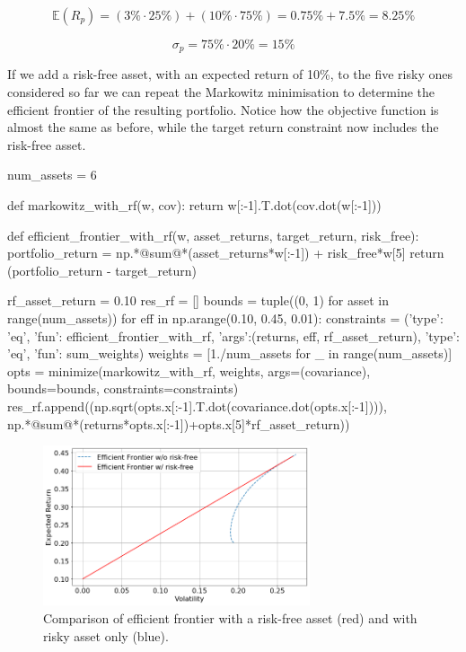 \[ \mathbb{E}(R_p) = (3\% \cdot 25\%) + (10\% \cdot 75\%) = 0.75\% + 7.5\% = 8.25\% \]

\[ \sigma_p = 75\% \cdot 20\% = 15\% \]

If we add a risk-free asset, with an expected return of 10\%, to the five risky ones considered so far we can repeat the Markowitz minimisation to determine the efficient frontier of the resulting portfolio. Notice how the objective function is almost the same as before, while the target return constraint now includes the risk-free asset.

\begin{ipython}
num_assets = 6

def markowitz_with_rf(w, cov):
    return w[:-1].T.dot(cov.dot(w[:-1]))

def efficient_frontier_with_rf(w, asset_returns, target_return, risk_free):
    portfolio_return = np.*@sum@*(asset_returns*w[:-1]) + risk_free*w[5]
    return (portfolio_return - target_return)

rf_asset_return = 0.10
res_rf = []
bounds = tuple((0, 1) for asset in range(num_assets))
for eff in np.arange(0.10, 0.45, 0.01):
    constraints = ({'type': 'eq', 'fun': efficient_frontier_with_rf,
	                'args':(returns, eff, rf_asset_return)},
                   {'type': 'eq', 'fun': sum_weights})
    weights = [1./num_assets for _ in range(num_assets)]
    opts = minimize(markowitz_with_rf, weights, args=(covariance),
                    bounds=bounds, constraints=constraints)
    res_rf.append((np.sqrt(opts.x[:-1].T.dot(covariance.dot(opts.x[:-1]))),
                   np.*@sum@*(returns*opts.x[:-1])+opts.x[5]*rf_asset_return))
\end{ipython}

\begin{figure}[htb]
\centering
    \includegraphics[width=0.7\textwidth]{figures/cal}
    \caption{Comparison of efficient frontier with a risk-free asset (red) and with risky asset only (blue).}
    \label{fig:cal}
\end{figure}
    
